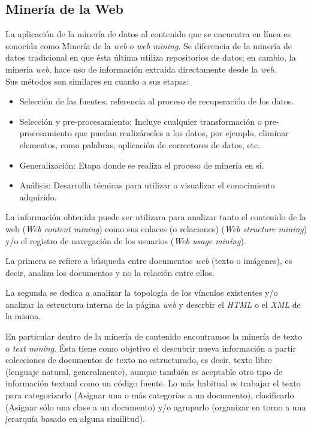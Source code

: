 	\subsection{Minería de la Web}
	\label{subsec:webMine}
	La aplicación de la minería de datos al contenido que se encuentra en línea es conocida como Minería de la \textit{web} o \textit{web mining}. Se diferencia de la minería de datos tradicional en que ésta última utiliza repositorios de datos; en cambio, la minería \textit{web}, hace uso de información extraída directamente desde la \textit{web}.\\
	Sus métodos son similares en cuanto a sus etapas:
	\begin{itemize}
	\item Selección de las fuentes: referencia al proceso de recuperación de los datos.
	\item Selección y pre-procesamiento: Incluye cualquier transformación o pre-procesamiento que puedan realizárseles a los datos, por ejemplo, eliminar elementos, como palabras, aplicación de correctores de datos, etc.
	\item Generalización: Etapa donde se realiza el proceso de minería en sí. 
	\item Análisis: Desarrolla técnicas para utilizar o visualizar el conocimiento adquirido.
	\end{itemize} 

	La información obtenida puede ser utilizara para analizar tanto el contenido de la web (\textit{Web content mining}) como sus enlaces (o relaciones) (\textit{Web  structure mining}) y/o el registro de navegación de los usuarios (\textit{Web usage mining}).

	La primera se refiere a búsqueda entre documentos \textit{web} (texto o imágenes), es decir, analiza los documentos y no la relación entre ellos.

	La segunda se dedica a analizar la topología de los vínculos existentes y/o analizar la estructura interna de la página \textit{web} y descrbir el \textit{HTML} o el \textit{XML} de la misma.

	En particular dentro de la minería de contenido encontramos la minería de texto o \textit{text mining}. Ésta tiene como objetivo el descubrir nueva información a partir colecciones de documentos de texto no estructurado, es decir, texto libre (lenguaje natural, generalmente), aunque también es aceptable otro tipo de información textual como un código fuente. Lo más habitual es trabajar el texto para categorizarlo (Asignar una o más categorías a un documento), clasificarlo (Asignar sólo una clase a un documento) y/o agruparlo (organizar en torno a una jerarquía basado en alguna similitud).

